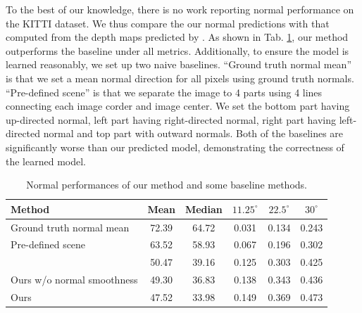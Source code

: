 To the best of our knowledge, there is no work reporting normal performance on the KITTI dataset. We thus compare the our normal predictions with that computed from the depth maps predicted by \cite{zhou2017unsupervised}. As shown in Tab. \ref{tbl:normal}, our method outperforms the baseline under all metrics. Additionally, to ensure the model is learned reasonably, we set up two naive baselines. ``Ground truth normal mean'' is that we set a mean normal direction for all pixels using ground truth normals. ``Pre-defined scene'' is that we separate the image to 4 parts using 4 lines connecting each image corder and image center. We set the bottom part having up-directed normal, left part having right-directed normal, right part having left-directed normal and top part with outward normals. Both of the baselines are significantly worse than our predicted model, demonstrating the correctness of the learned model.



\begin{table}[t] \small
\centering
\caption{Normal performances of our method and some baseline methods.}
\label{tbl:normal}
\fontsize{6.5}{7}\selectfont
\bgroup
\def\arraystretch{1.2}
\begin{tabular}{l|c|c|c|c|c}
\thickhline
Method                        & Mean  & Median & $11.25^{\circ}$ & $22.5^{\circ}$  & $30^{\circ}$    \\ \hline
Ground truth normal mean      & 72.39 & 64.72  & 0.031 & 0.134 & 0.243 \\
Pre-defined scene             & 63.52 & 58.93  & 0.067 & 0.196 & 0.302 \\
\cite{zhou2017unsupervised} & 50.47 & 39.16  & 0.125 & 0.303 & 0.425 \\
Ours w/o normal smoothness    & 49.30 & 36.83  & 0.138 & 0.343 & 0.436 \\
Ours                          & 47.52 & 33.98  & 0.149 & 0.369 & 0.473 \\ \hline
\end{tabular}
\egroup
\vspace{-1.0\baselineskip}
\end{table}


